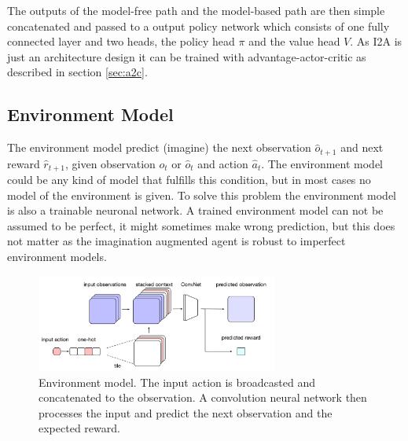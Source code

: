 The outputs of the model-free path and the model-based path are then simple concatenated and passed to a output policy network which consists of one fully connected layer and two heads, the policy head $\pi$ and the value head $V$.
As I2A is just an architecture design it can be trained with advantage-actor-critic as described in section \ref{sec:a2c}.\\

 
 


 

\subsection{Environment Model}
\label{sec:env_model}

The environment model predict (imagine) the next observation $\hat{o}_{t+1}$ and next reward $\hat{r}_{t+1}$, given observation $o_t$ or $\hat{o}_t$ and action $\hat{a}_t$.
The environment model could be any kind of model that fulfills this condition, but in most cases no model of the environment is given.
To solve this problem the environment model is also a trainable neuronal network.
A trained environment model can not be assumed to be perfect, it might sometimes make wrong prediction, but this does not matter as the imagination augmented agent is robust to imperfect environment models.

   
\begin{figure}[H] 
  \centering 
   
  \includegraphics[width=300px]{./Images/environment_model_architecture.png}
  \caption{Environment model. The input action is broadcasted and concatenated to the observation. A convolution neural network then processes the input and predict the next observation and the expected reward.} 
  \label{fig:environment_model_architecture} 
\end{figure} 

